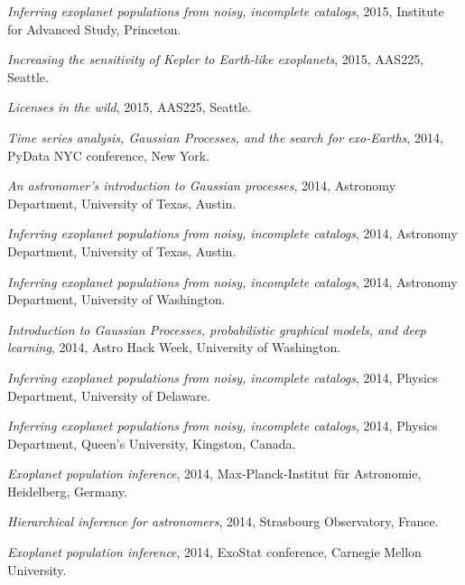 \documentclass[12pt,letterpaper]{article}
\begin{document}
\begin{list}{}{\cvlist}
\item \emph{Inferring exoplanet populations from noisy, incomplete catalogs},
    2015, Institute for Advanced Study, Princeton.

\item \emph{Increasing the sensitivity of Kepler to Earth-like exoplanets},
    2015, AAS225, Seattle.

\item \emph{Licenses in the wild},
    2015, AAS225, Seattle.

\item \emph{Time series analysis, Gaussian Processes, and the search for
            exo-Earths},
    2014, PyData NYC conference, New York.

\item \emph{An astronomer's introduction to Gaussian processes},
    2014, Astronomy Department, University of Texas, Austin.

\item \emph{Inferring exoplanet populations from noisy, incomplete catalogs},
    2014, Astronomy Department, University of Texas, Austin.

\item \emph{Inferring exoplanet populations from noisy, incomplete catalogs},
    2014, Astronomy Department, University of Washington.

\item \emph{Introduction to Gaussian Processes, probabilistic graphical
            models, and deep learning},
    2014, Astro Hack Week, University of Washington.

\item \emph{Inferring exoplanet populations from noisy, incomplete catalogs},
    2014, Physics Department, University of Delaware.

\item \emph{Inferring exoplanet populations from noisy, incomplete catalogs},
    2014, Physics Department, Queen's University, Kingston, Canada.

\item \emph{Exoplanet population inference},
    2014, Max-Planck-Institut f\"ur Astronomie, Heidelberg, Germany.

\item \emph{Hierarchical inference for astronomers},
    2014, Strasbourg Observatory, France.

\item \emph{Exoplanet population inference},
    2014, ExoStat conference, Carnegie Mellon University.


\end{list}
\end{document}
